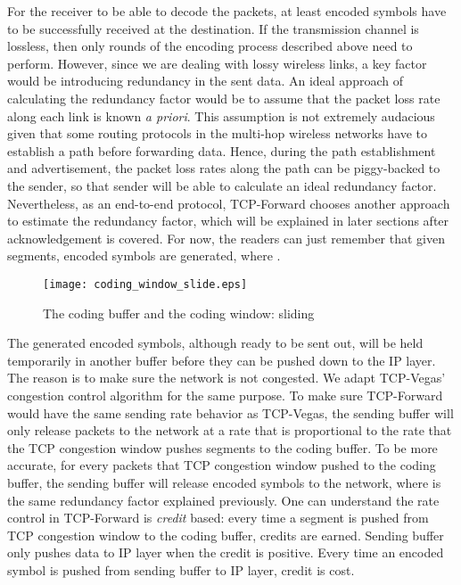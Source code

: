 \documentclass[10pt, conference, final, letterpaper]{IEEEtran}
\theoremstyle{definition}
\begin{document}
For the receiver to be able to decode the packets, at least  encoded symbols have to be successfully received at the destination. If the transmission channel is lossless, then only  rounds of the encoding process described above need to perform. However, since we are dealing with lossy wireless links, a key factor would be introducing redundancy in the sent data. An ideal approach of calculating the redundancy factor would be to assume that the packet loss rate along each link is known \textit{a priori}. This assumption is not extremely audacious given that some routing protocols in the multi-hop wireless networks have to establish a path before forwarding data. Hence, during the path establishment and advertisement, the packet loss rates along the path can be piggy-backed to the sender, so that sender will be able to calculate an ideal redundancy factor. Nevertheless, as an end-to-end protocol, TCP-Forward chooses another approach to estimate the redundancy factor, which will be explained in later sections after acknowledgement is covered. For now, the readers can just remember that given  segments,  encoded symbols are generated, where .

\begin{figure}[hbt]
	\begin{center}
		\texttt{[image: coding\_window\_slide.eps]}
	\end{center}
	\caption{The coding buffer and the coding window: sliding}
	\label{fig:coding_window_slide}
\end{figure}

The generated encoded symbols, although ready to be sent out, will be held temporarily in another buffer before they can be pushed down to the IP layer. The reason is to make sure the network is not congested. We adapt TCP-Vegas' congestion control algorithm for the same purpose. To make sure TCP-Forward would have the same sending rate behavior as TCP-Vegas, the sending buffer will only release packets to the network at a rate that is proportional to the rate that the TCP congestion window pushes segments to the coding buffer. To be more accurate, for every  packets that TCP congestion window pushed to the coding buffer, the sending buffer will release  encoded symbols to the network, where  is the same redundancy factor explained previously. One can understand the rate control in TCP-Forward is \textit{credit} based: every time a segment is pushed from TCP congestion window to the coding buffer,  credits are earned. Sending buffer only pushes data to IP layer when the credit is positive. Every time an encoded symbol is pushed from sending buffer to IP layer,  credit is cost.
\end{document}

